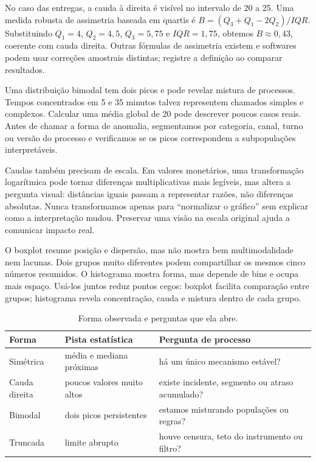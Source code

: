 No caso das entregas, a cauda à direita é visível no intervalo de 20 a 25. Uma medida robusta de assimetria baseada em quartis é $B=(Q_3+Q_1-2Q_2)/IQR$. Substituindo $Q_1=4$, $Q_2=4{,}5$, $Q_3=5{,}75$ e $IQR=1{,}75$, obtemos $B\approx0{,}43$, coerente com cauda direita. Outras fórmulas de assimetria existem e softwares podem usar correções amostrais distintas; registre a definição ao comparar resultados.

Uma distribuição bimodal tem dois picos e pode revelar mistura de processos. Tempos concentrados em 5 e 35 minutos talvez representem chamados simples e complexos. Calcular uma média global de 20 pode descrever poucos casos reais. Antes de chamar a forma de anomalia, segmentamos por categoria, canal, turno ou versão do processo e verificamos se os picos correspondem a subpopulações interpretáveis.

Caudas também precisam de escala. Em valores monetários, uma transformação logarítmica pode tornar diferenças multiplicativas mais legíveis, mas altera a pergunta visual: distâncias iguais passam a representar razões, não diferenças absolutas. Nunca transformamos apenas para ``normalizar o gráfico'' sem explicar como a interpretação mudou. Preservar uma visão na escala original ajuda a comunicar impacto real.

O boxplot resume posição e dispersão, mas não mostra bem multimodalidade nem lacunas. Dois grupos muito diferentes podem compartilhar os mesmos cinco números resumidos. O histograma mostra forma, mas depende de bins e ocupa mais espaço. Usá-los juntos reduz pontos cegos: boxplot facilita comparação entre grupos; histograma revela concentração, cauda e mistura dentro de cada grupo.

\begin{table}[htbp]
\centering
\small
\caption{Forma observada e perguntas que ela abre.}
\label{tab:forma-pergunta}
\begin{tabularx}{0.94\textwidth}{@{}p{2.5cm}YY@{}}
\toprule
\textbf{Forma} & \textbf{Pista estatística} & \textbf{Pergunta de processo} \\
\midrule
Simétrica & média e mediana próximas & há um único mecanismo estável? \\
Cauda direita & poucos valores muito altos & existe incidente, segmento ou atraso acumulado? \\
Bimodal & dois picos persistentes & estamos misturando populações ou regras? \\
Truncada & limite abrupto & houve censura, teto do instrumento ou filtro? \\
\bottomrule
\end{tabularx}
\end{table}

